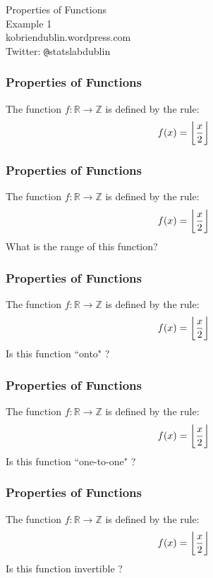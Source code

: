 \documentclass{beamer}
\begin{document}
\begin{frame}
\begin{center}
\Huge
Properties of Functions\\
\LARGE
Example 1\\
\bigskip
kobriendublin.wordpress.com\\
Twitter: \texttt{@}statslabdublin


\end{center}

\end{frame}

\begin{frame}
\frametitle{Properties of Functions}
\huge
\vspace{-1cm}
The function $f : \mathbb{R} \rightarrow \mathbb{Z}$ is defined by the rule:
\[f(x) = \bigg\lfloor  {x \over 2}\bigg\rfloor \]



\end{frame}

\begin{frame}
\frametitle{Properties of Functions}
\Large
\vspace{-2cm}
The function $f : \mathbb{R} \rightarrow \mathbb{Z}$ is defined by the rule:
\[f(x) = \bigg\lfloor  {x \over 2}\bigg\rfloor \]
What is the range of this function?


\end{frame}
\begin{frame}
\frametitle{Properties of Functions}
\Large
\vspace{-2cm}
The function $f : \mathbb{R} \rightarrow \mathbb{Z}$ is defined by the rule:
\[f(x) = \bigg\lfloor  {x \over 2}\bigg\rfloor \]
Is this function ``onto" ?


\end{frame}
\begin{frame}
\frametitle{Properties of Functions}
\Large
\vspace{-2cm}
The function $f : \mathbb{R} \rightarrow \mathbb{Z}$ is defined by the rule:
\[f(x) = \bigg\lfloor  {x \over 2}\bigg\rfloor \]
Is this function ``one-to-one" ?


\end{frame}
\begin{frame}
\frametitle{Properties of Functions}
\Large
\vspace{-2cm}
The function $f : \mathbb{R} \rightarrow \mathbb{Z}$ is defined by the rule:
\[f(x) = \bigg\lfloor  {x \over 2}\bigg\rfloor \]
Is this function invertible ?


\end{frame}
\end{document}

